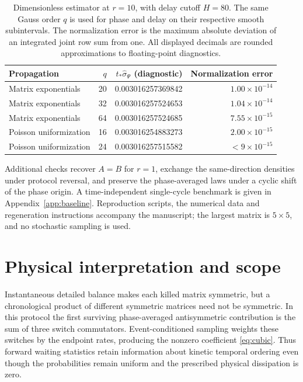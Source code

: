 \documentclass[11pt,a4paper]{article}
\newcommand{\ts}{t_*}
\newcommand{\sigw}{\widehat{\sigma}_{\Psi}}
\begin{document}
\begin{table}[tb]
\centering
\caption{Dimensionless estimator at $r=10$, with delay cutoff $H=80$. The same Gauss order $q$ is used for phase and delay on their respective smooth subintervals. The normalization error is the maximum absolute deviation of an integrated joint row sum from one. All displayed decimals are rounded approximations to floating-point diagnostics.}
\label{tab:numeric}
\begin{tabular}{lrrr}
\toprule
Propagation & $q$ & $\ts\sigw$ (diagnostic) & Normalization error\\
\midrule
Matrix exponentials & 20 & 0.003016257369842 & $1.00\times10^{-14}$\\
Matrix exponentials & 32 & 0.003016257524653 & $1.04\times10^{-14}$\\
Matrix exponentials & 64 & 0.003016257524685 & $7.55\times10^{-15}$\\
Poisson uniformization & 16 & 0.003016254883273 & $2.00\times10^{-15}$\\
Poisson uniformization & 24 & 0.003016257515582 & $<9\times10^{-15}$\\
\bottomrule
\end{tabular}
\end{table}

Additional checks recover $A=B$ for $r=1$, exchange the same-direction densities under protocol reversal, and preserve the phase-averaged laws under a cyclic shift of the phase origin. A time-independent single-cycle benchmark is given in Appendix~\ref{app:baseline}. Reproduction scripts, the numerical data and regeneration instructions accompany the manuscript; the largest matrix is $5\times5$, and no stochastic sampling is used.

\section{Physical interpretation and scope}
Instantaneous detailed balance makes each killed matrix symmetric, but a chronological product of different symmetric matrices need not be symmetric. In this protocol the first surviving phase-averaged antisymmetric contribution is the sum of three switch commutators. Event-conditioned sampling weights these switches by the endpoint rates, producing the nonzero coefficient \eqref{eq:cubic}. Thus forward waiting statistics retain information about kinetic temporal ordering even though the probabilities remain uniform and the prescribed physical dissipation is zero.
\end{document}
